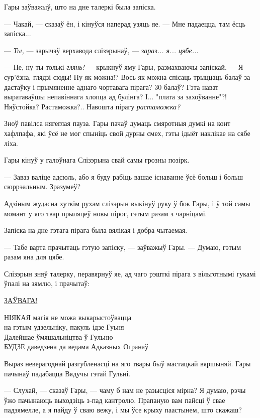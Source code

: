 Гары заўважыў, што на дне талеркі была запіска.

--- Чакай, --- сказаў ён, і кінуўся наперад узяць яе. --- Мне падаецца, там 
ёсць запіска...

--- \emph{Ты,} --- зарычэў верхавода слізэрынаў, --- \emph{зараз... я... цябе...}

--- Не, ну ты толькі \emph{глянь!} --- крыкнуў яму Гары, размахваючы запіскай. --- 
Я сур'ёзна, глядзі сюды! Ну як можна!? Вось як можна спісаць трыццаць балаў за 
дастаўку і прымяненне аднаго чортавага пірага? 30 балаў? Гэта нават выратаваўшы 
непавіннага хлопца ад булінга? І... "плата за захоўванне"?! Няўстойка? Растаможка?..
Навошта пірагу \emph{растаможка?} 

Зноў павілса нягеглая пауза. Гары пачаў думаць смяротныя думкі на конт хафлпафа,
які ўсё не мог спыніць свой дурны смех, гэты ідыёт наклікае на сябе ліха.

Гары кінуў у галоўнага Слізэрына свай самы грозны позірк. 

--- Заваз валіце адсюль, або я буду рабіць вашае існаванне ўсё больш і больш 
сюррэальным. Зразумеў?

Адзіным жудасна хуткім рухам слізэрын выкінуў руку ў бок Гары, і ў той самы момант 
у яго твар прыляцеў новы пірог, гэтым разам з чарніцамі.

Запіска на дне гэтага пірага была вялікая і добра чытаемая. 

--- Табе варта прачытаць гэтую запіску, --- заўважыў Гары. --- Думаю, гэтым разам 
яна для цябе.

Слізэрын зняў талерку, перавярнуў яе, ад чаго рэшткі пірага з вільготнымі гукамі ўпалі
на зямлю, і прачытаў:

\begin{writtenNoteGame}
\MakeUppercase{\underline{Заўвага!}}

\MakeUppercase{Ніякая} магія не можа выкарыстоўвацца\\
на гэтым удзельніку, пакуль ідзе Гуьня\\
Далейшае ўмяшальніцтва ў Гульню\\
\MakeUppercase{будзе} даведзена да ведама Адказных Огранаў
\end{writtenNoteGame}

Выраз неверагоднай разгубленасці на яго твары быў мастацкай вяршыняй. 
Гары пачынаў падабацца Вядучы гэтай Гульні.  

--- Слухай, --- сказаў Гары, --- чаму б нам не разысціся мірна? Я думаю, рэчы
ўжо пачынаюць выходзіць з-пад кантролю. Прапаную вам пайсці ў свае падзямелле, а я
пайду ў сваю вежу, і мы ўсе крыху паастынем, што скажаш?

